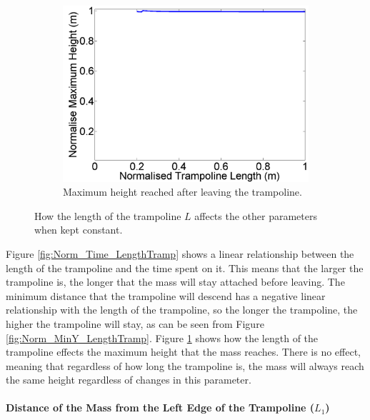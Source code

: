 \begin{figure}[H]
\begin{subfigure}[t]{0.3\textwidth}
		\includegraphics[width=\textwidth]{Norm_Height_LengthTramp.png}
    	\caption{Maximum height reached after leaving the trampoline.}\label{fig:Norm_Height_LengthTramp}
    \end{subfigure}\hfill
    \caption{How the length of the trampoline $L$ affects the other parameters when kept constant.}\label{fig:Norm_LengthTramp}
\end{figure}


\noindent Figure \ref{fig:Norm_Time_LengthTramp} shows a linear relationship between the length of the trampoline and the time spent on it. This means that the larger the trampoline is, the longer that the mass will stay attached before leaving. 
The minimum distance that the trampoline will descend has a negative linear relationship with the length of the trampoline, so the longer the trampoline, the higher the trampoline will stay, as can be seen from Figure \ref{fig:Norm_MinY_LengthTramp}.
Figure \ref{fig:Norm_Height_LengthTramp} shows how the length of the trampoline effects the maximum height that the mass reaches. There is no effect, meaning that regardless of how long the trampoline is, the mass will always reach the same height regardless of changes in this parameter.



\paragraph{Distance of the Mass from the Left Edge of the Trampoline ($L_1$)}\mbox{}\\


